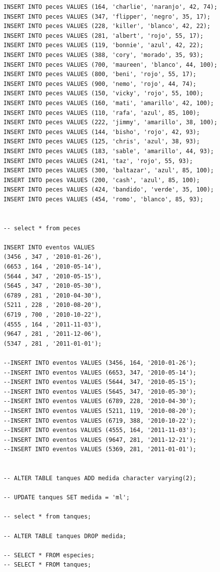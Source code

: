 \documentclass[letter,12pt]{report}
\begin{document}
\begin{lstlisting}
INSERT INTO peces VALUES (164, 'charlie', 'naranjo', 42, 74);
INSERT INTO peces VALUES (347, 'flipper', 'negro', 35, 17);
INSERT INTO peces VALUES (228, 'killer', 'blanco', 42, 22);
INSERT INTO peces VALUES (281, 'albert', 'rojo', 55, 17);
INSERT INTO peces VALUES (119, 'bonnie', 'azul', 42, 22);
INSERT INTO peces VALUES (388, 'cory', 'morado', 35, 93);
INSERT INTO peces VALUES (700, 'maureen', 'blanco', 44, 100);
INSERT INTO peces VALUES (800, 'beni', 'rojo', 55, 17);
INSERT INTO peces VALUES (900, 'nemo', 'rojo', 44, 74);
INSERT INTO peces VALUES (150, 'vicky', 'rojo', 55, 100);
INSERT INTO peces VALUES (160, 'mati', 'amarillo', 42, 100);
INSERT INTO peces VALUES (110, 'rafa', 'azul', 85, 100);
INSERT INTO peces VALUES (222, 'jimmy', 'amarillo', 38, 100);
INSERT INTO peces VALUES (144, 'bisho', 'rojo', 42, 93);
INSERT INTO peces VALUES (125, 'chris', 'azul', 38, 93);
INSERT INTO peces VALUES (183, 'sable', 'amarillo', 44, 93);
INSERT INTO peces VALUES (241, 'taz', 'rojo', 55, 93);
INSERT INTO peces VALUES (300, 'baltazar', 'azul', 85, 100);
INSERT INTO peces VALUES (200, 'cash', 'azul', 85, 100);
INSERT INTO peces VALUES (424, 'bandido', 'verde', 35, 100);
INSERT INTO peces VALUES (454, 'romo', 'blanco', 85, 93);


-- select * from peces

INSERT INTO eventos VALUES 
(3456 , 347 , '2010-01-26'),
(6653 , 164 , '2010-05-14'),
(5644 , 347 , '2010-05-15'),
(5645 , 347 , '2010-05-30'),
(6789 , 281 , '2010-04-30'),
(5211 , 228 , '2010-08-20'),
(6719 , 700 , '2010-10-22'),
(4555 , 164 , '2011-11-03'),
(9647 , 281 , '2011-12-06'),
(5347 , 281 , '2011-01-01');

--INSERT INTO eventos VALUES (3456, 164, '2010-01-26'); 
--INSERT INTO eventos VALUES (6653, 347, '2010-05-14'); 
--INSERT INTO eventos VALUES (5644, 347, '2010-05-15'); 
--INSERT INTO eventos VALUES (5645, 347, '2010-05-30'); 
--INSERT INTO eventos VALUES (6789, 228, '2010-04-30'); 
--INSERT INTO eventos VALUES (5211, 119, '2010-08-20'); 
--INSERT INTO eventos VALUES (6719, 388, '2010-10-22'); 
--INSERT INTO eventos VALUES (4555, 164, '2011-11-03'); 
--INSERT INTO eventos VALUES (9647, 281, '2011-12-21'); 
--INSERT INTO eventos VALUES (5369, 281, '2011-01-01'); 


-- ALTER TABLE tanques ADD medida character varying(2); 

-- UPDATE tanques SET medida = 'ml';

-- select * from tanques;

-- ALTER TABLE tanques DROP medida;

-- SELECT * FROM especies;
-- SELECT * FROM tanques;
\end{lstlisting}\vspace{-0.3cm}
\end{document}
